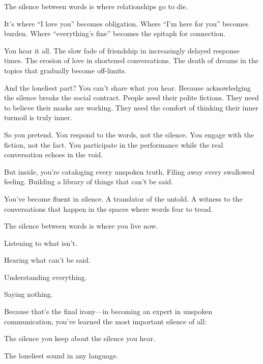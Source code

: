 \documentclass[12pt,letterpaper]{book}
\begin{document}
The silence between words is where relationships go to die.

It's where ``I love you'' becomes obligation. Where ``I'm here for you'' becomes burden. Where ``everything's fine'' becomes the epitaph for connection.

You hear it all. The slow fade of friendship in increasingly delayed response times. The erosion of love in shortened conversations. The death of dreams in the topics that gradually become off-limits.

And the loneliest part? You can't share what you hear. Because acknowledging the silence breaks the social contract. People need their polite fictions. They need to believe their masks are working. They need the comfort of thinking their inner turmoil is truly inner.

So you pretend. You respond to the words, not the silence. You engage with the fiction, not the fact. You participate in the performance while the real conversation echoes in the void.

But inside, you're cataloging every unspoken truth. Filing away every swallowed feeling. Building a library of things that can't be said.

You've become fluent in silence. A translator of the untold. A witness to the conversations that happen in the spaces where words fear to tread.

The silence between words is where you live now.

Listening to what isn't.

Hearing what can't be said.

Understanding everything.

Saying nothing.

Because that's the final irony—in becoming an expert in unspoken communication, you've learned the most important silence of all:

The silence you keep about the silence you hear.

The loneliest sound in any language.
\end{document}
